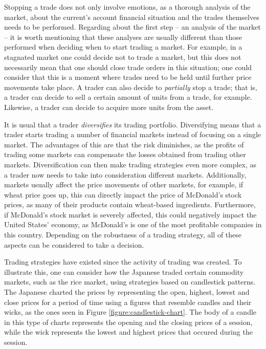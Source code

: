 Stopping a trade does not only involve emotions, as a thorough analysis of the market, about the current's account financial situation and the trades themselves needs to be performed. Regarding about the first step -- an analysis of the market -- it is worth mentioning that these analyses are usually different than those performed when deciding when to start trading a market. For example, in a stagnated market one could decide not to trade a market, but this does not necessarily mean that one should close trade orders in this situation; one could consider that this is a moment where trades need to be held until further price movements take place. A trader can also decide to \textit{partially} stop a trade; that is, a trader can decide to sell a certain amount of units from a trade, for example. Likewise, a trader can decide to acquire more units from the asset.

It is usual that a trader \textit{diversifies} its trading portfolio. Diversifying means that a trader starts trading a number of financial markets instead of focusing on a single market. The advantages of this %
are that the risk diminishes, as the profits of trading some markets can compensate the losses obtained from trading other markets. Diversification can then make trading strategies even more complex, as a trader now needs to take into consideration different markets. Additionally, markets usually affect the price movements of other markets, for example, if wheat price goes up, this can directly impact the price of McDonald's stock prices, as many of their products contain wheat-based ingredients. Furthermore, if McDonald's stock market is severely affected, this could negatively impact the United States' economy, as McDonald's is one of the most profitable companies in this country. Depending on the robustness of a trading strategy, all of these aspects can be considered to take a decision.

Trading strategies have existed since the activity of trading was created. To illustrate this, one can consider how the Japanese traded certain commodity markets, such as the rice market, using strategies based on candlestick patterns. %
The Japanese charted the prices by representing the open, highest, lowest and close prices for a period of time using a figures that resemble candles and their wicks, as the ones seen in Figure \ref{figure:candlestick-chart}. The body of a candle in this type of charts represents the opening and the closing prices of a session, while the wick represents the lowest and highest prices that occured during the session.


